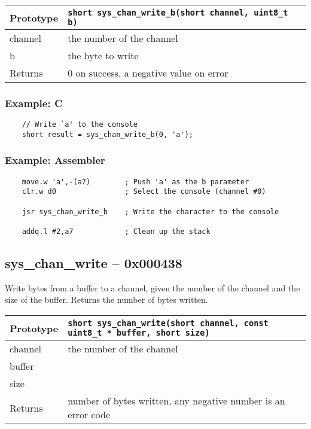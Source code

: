 \bigskip

\begin{tabular}{|l||l|} \hline
Prototype & \lstinline!short sys_chan_write_b(short channel, uint8_t b)! \\ \hline
channel & the number of the channel \\ \hline
b & the byte to write \\ \hline
Returns & 0 on success, a negative value on error \\ \hline
\end{tabular}

\subsubsection*{Example: C}
\begin{lstlisting}
    // Write `a' to the console
    short result = sys_chan_write_b(0, 'a');
\end{lstlisting}

\subsubsection*{Example: Assembler}
\begin{verbatim}
    move.w 'a',-(a7)        ; Push 'a' as the b parameter
    clr.w d0                ; Select the console (channel #0)

    jsr sys_chan_write_b    ; Write the character to the console

    addq.l #2,a7            ; Clean up the stack
\end{verbatim}

\subsection*{sys\_chan\_write -- 0x000438}
Write bytes from a buffer to a channel, given the number of the channel and the size of the buffer. Returns the number of bytes written.

\bigskip

\begin{tabular}{|l||l|} \hline
Prototype & \lstinline!short sys_chan_write(short channel, const uint8_t * buffer, short size)! \\ \hline
channel & the number of the channel \\ \hline
buffer &  \\ \hline
size &  \\ \hline
Returns & number of bytes written, any negative number is an error code \\ \hline
\end{tabular}

